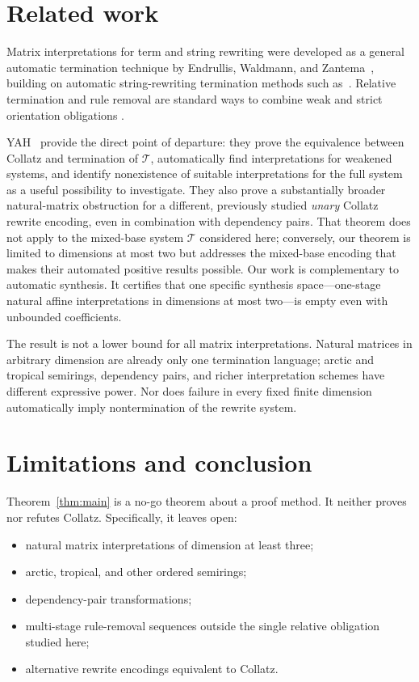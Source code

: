 \documentclass[11pt]{article}
\theoremstyle{definition}
\newcommand{\Tsys}{\mathcal{T}}
\begin{document}
\section{Related work}

Matrix interpretations for term and string rewriting were developed as a
general automatic termination technique by Endrullis, Waldmann, and
Zantema~\cite{endmat}, building on automatic string-rewriting termination
methods such as~\cite{zantema}.  Relative termination and rule removal are
standard ways to combine weak and strict orientation obligations
\cite{termbook}.

YAH~\cite{yah} provide the direct point of departure: they prove the
equivalence between Collatz and termination of $\Tsys$, automatically find
interpretations for weakened systems, and identify nonexistence of suitable
interpretations for the full system as a useful possibility to investigate.
They also prove a substantially broader natural-matrix obstruction for a
different, previously studied \emph{unary} Collatz rewrite encoding, even in
combination with dependency pairs.  That theorem does not apply to the
mixed-base system $\Tsys$ considered here; conversely, our theorem is limited
to dimensions at most two but addresses the mixed-base encoding that makes
their automated positive results possible.
Our work is complementary to automatic synthesis.  It certifies that one
specific synthesis space---one-stage natural affine interpretations in
dimensions at most two---is empty even with unbounded coefficients.

The result is not a lower bound for all matrix interpretations.  Natural
matrices in arbitrary dimension are already only one termination language;
arctic and tropical semirings, dependency pairs, and richer interpretation
schemes have different expressive power.  Nor does failure in every fixed
finite dimension automatically imply nontermination of the rewrite system.

\section{Limitations and conclusion}

Theorem~\ref{thm:main} is a no-go theorem about a proof method.  It neither
proves nor refutes Collatz.  Specifically, it leaves open:
\begin{itemize}[leftmargin=*]
  \item natural matrix interpretations of dimension at least three;
  \item arctic, tropical, and other ordered semirings;
  \item dependency-pair transformations;
  \item multi-stage rule-removal sequences outside the single relative
        obligation studied here;
  \item alternative rewrite encodings equivalent to Collatz.
\end{itemize}
\end{document}

